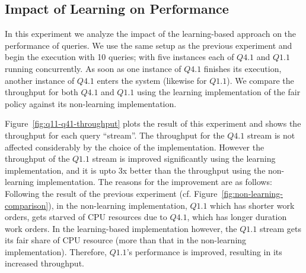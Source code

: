 \subsection{Impact of Learning on Performance}\label{ssec:learning-impact-perf}
In this experiment we analyze the impact of the learning-based approach on the performance of queries. 
We use the same setup as the previous experiment and begin the execution with 10 queries; with five instances each of $Q4.1$ and $Q1.1$ running concurrently. 
As soon as one instance of $Q4.1$ finishes its execution, another instance of $Q4.1$ enters the system (likewise for $Q1.1$).
We compare the throughput for both $Q4.1$ and $Q1.1$ using the learning implementation of the fair policy against its non-learning implementation.



Figure~\ref{fig:q11-q41-throughput} plots the result of this experiment and shows the throughput for each query ``stream''. 
The throughput for the $Q4.1$ stream is not affected considerably by the choice of the implementation. 
However the throughput of the $Q1.1$ stream is improved significantly using the learning implementation, and it is upto 3x better than the throughput using the non-learning implementation. 
The reasons for the improvement are as follows:
Following the result of the previous experiment (cf. Figure~\ref{fig:non-learning-comparison}),
in the non-learning implementation, $Q1.1$ which has shorter work orders, gets starved of CPU resources due to $Q4.1$, which has longer duration work orders. 
In the learning-based implementation however, the $Q1.1$ stream gets its fair share of CPU resource (more than that in the non-learning implementation). 
Therefore, $Q1.1$'s performance is improved, resulting in its increased throughput. 

